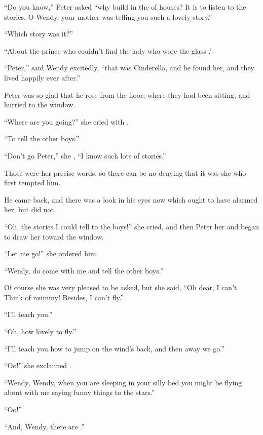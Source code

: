 \documentclass[troisieme]{fiche}
\begin{document}
\begin{texte}
``Do you know,'' Peter asked ``why  build in the
 of houses? It is to listen to the stories. O Wendy, your
mother was telling you such a lovely story.''

``Which story was it?''

``About the prince who couldn't find the lady who wore the glass
.''

``Peter,'' said Wendy excitedly, ``that was Cinderella, and he found her, and they lived
happily ever after.''

Peter was so glad that he rose from the floor, where they had been sitting, and hurried to the
window.

``Where are you going?'' she cried with .

``To tell the other boys.''

``Don't go Peter,'' she , ``I know such lots of stories.''

Those were her precise words, so there can be no denying that it was she who first tempted
him.

He came back, and there was a  look in his eyes now which ought to
have alarmed her, but did not.

``Oh, the stories I could tell to the boys!'' she cried, and then Peter
 her and began to draw her toward the window.

``Let me go!'' she ordered him.

``Wendy, do come with me and tell the other boys.''

Of course she was very pleased to be asked, but she said, ``Oh dear, I can't. Think of mummy!
Besides, I can't fly.''

``I'll teach you.''

``Oh, how lovely to fly.''

``I'll teach you how to jump on the wind's back, and then away we go.''

``Oo!'' she exclaimed .

``Wendy, Wendy, when you are sleeping in your silly bed you might be flying about with me
saying funny things to the stars.''

``Oo!''

``And, Wendy, there are .''


\end{texte}
\end{document}
